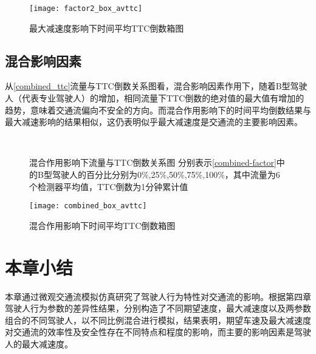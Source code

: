 \begin{figure}[H]
\begin{center}
\texttt{[image: factor2\_box\_avttc]}
\caption{最大减速度影响下时间平均TTC倒数箱图}
\label{factor2_box_avttc}
\end{center}
\end{figure}

\subsection{混合影响因素}

从\autoref{combined_ttc}流量与TTC倒数关系图看，混合影响因素作用下，随着B型驾驶人（代表专业驾驶人）的增加，相同流量下TTC倒数的绝对值的最大值有增加的趋势，意味着交通流偏向不安全的方向。而混合作用影响下的时间平均倒数结果与最大减速影响的结果相似，这仍表明似乎最大减速度是交通流的主要影响因素。
\begin{figure}[H]%
\centering
{}%
\\%
%
\caption[A set of four sub-floats.]{混合作用影响下流量与TTC倒数关系图
分别表示\autoref{combined-factor}中的B型驾驶人的百分比分别为0\%,25\%,50\%,75\%,100\%，其中流量为6个检测器平均值，TTC倒数为1分钟累计值}%
\label{combined_ttc}%
\end{figure}

\begin{figure}[H]
\begin{center}
\texttt{[image: combined\_box\_avttc]}
\caption{混合作用影响下时间平均TTC倒数箱图}
\label{combined_box_avttc}
\end{center}
\end{figure}

\section{本章小结}
本章通过微观交通流模拟仿真研究了驾驶人行为特性对交通流的影响。根据第四章驾驶人行为参数的差异性结果，分别构造了不同期望速度，最大减速度以及两参数组合的不同驾驶人，以不同比例混合进行模拟，结果表明，期望车速及最大减速度对交通流的效率性及安全性存在不同特点和程度的影响，而主要的影响因素是驾驶人的最大减速度。
